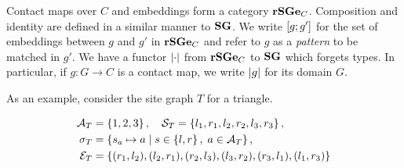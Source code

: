 Contact maps over $C$ and embeddings form a category $\mathbf{rSGe}_C$.
Composition and identity %
are defined in a similar manner to $\mathbf{SG}$.
We write $\left[g;g'\right]$ for the set of embeddings
between $g$ and $g'$ in $\mathbf{rSGe}_C$
and refer to $g$ as a \emph{pattern}
to be matched in $g'$.
We have a functor $\left|\cdot\right|$
from $\mathbf{rSGe}_C$ to $\mathbf{SG}$ which forgets types.
In particular, if $g: G \to C$ is a contact map,
we write $\left|g\right|$ for its domain $G$.

As an example, consider the site graph $T$ for a triangle.

\vspace{-.2cm}
\begin{minipage}{.5\textwidth}
  \begin{align*}
    \mathcal{A}_T &= \left\{ 1, 2, 3 \right\}, \quad
    \mathcal{S}_T = \left\{ l_1, r_1, l_2, r_2, l_3, r_3 \right\}, \\
    \sigma_T &= \left\{ s_a \mapsto a \; | \; 
      s \in \left\{ l, r \right\},\; a \in \mathcal{A}_T \right\}, \\
    \mathcal{E}_T &= \left\{ (r_1, l_2), (l_2, r_1), (r_2, l_3),
      (l_3, r_2), (r_3, l_1), (l_1, r_3) \right\}
  \end{align*}
\end{minipage}
\begin{minipage}{.32\textwidth}
  \vspace{.7cm}
  \begin{center}
  \end{center}
\end{minipage}
\newline
\vspace{.2cm}

